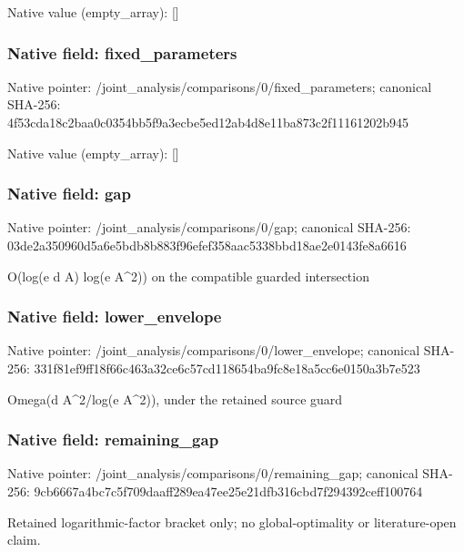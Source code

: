 \documentclass[10pt,a4paper]{article}
\begin{document}
Native value (empty\_\allowbreak{}array): []

\subsubsection{Native field: fixed\_\allowbreak{}parameters}
Native pointer: /joint\_\allowbreak{}analysis/comparisons/0/fixed\_\allowbreak{}parameters; canonical SHA-256: 4f53cda18c2baa0c0354bb5f9a3ecbe5ed12ab4d8e11ba873c2f11161202b945

Native value (empty\_\allowbreak{}array): []

\subsubsection{Native field: gap}
Native pointer: /joint\_\allowbreak{}analysis/comparisons/0/gap; canonical SHA-256: 03de2a350960d5a6e5bdb8b883f96efef358aac5338bbd18ae2e0143fe8a6616

\begingroup\raggedright\sloppy O(log(e d A) log(e A\textasciicircum{}2)) on the compatible guarded intersection\par\endgroup

\subsubsection{Native field: lower\_\allowbreak{}envelope}
Native pointer: /joint\_\allowbreak{}analysis/comparisons/0/lower\_\allowbreak{}envelope; canonical SHA-256: 331f81ef9ff18f66c463a32ce6c57cd118654ba9fc8e18a5cc6e0150a3b7e523

\begingroup\raggedright\sloppy Omega(d A\textasciicircum{}2/\allowbreak{}log(e A\textasciicircum{}2)),\allowbreak{} under the retained source guard\par\endgroup

\subsubsection{Native field: remaining\_\allowbreak{}gap}
Native pointer: /joint\_\allowbreak{}analysis/comparisons/0/remaining\_\allowbreak{}gap; canonical SHA-256: 9cb6667a4bc7c5f709daaff289ea47ee25e21dfb316cbd7f294392ceff100764

\begingroup\raggedright\sloppy Retained logarithmic-factor bracket only;\allowbreak{} no global-optimality or literature-open claim.\par\endgroup
\end{document}
